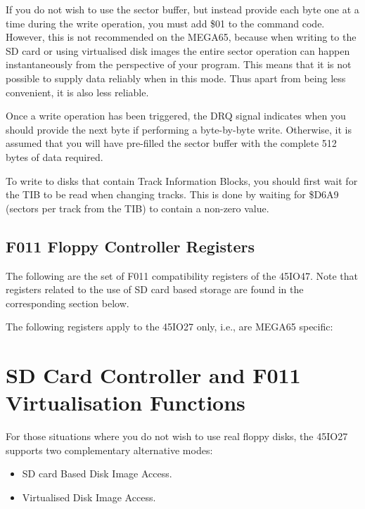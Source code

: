 If you do not wish
to use the sector buffer, but instead provide each byte one at a time
during the write operation, you must add \$01 to the command code.
However, this is not recommended on the MEGA65, because when writing
to the SD card or using virtualised disk images the entire sector
operation can happen instantaneously from the perspective of your
program.  This means that it is not possible to supply data reliably
when in this mode.  Thus apart from being less convenient, it is also
less reliable. 

Once a write operation has been triggered, the DRQ signal indicates
when you should provide the next byte if performing a byte-by-byte
write. Otherwise, it is assumed that you will have pre-filled the
sector buffer with the complete 512 bytes of data required.

To write to disks that contain Track Information Blocks,
you should first wait for the TIB to be read when changing tracks. This is done by waiting
for \$D6A9 (sectors per track from the TIB) to contain a non-zero value.

\subsection{F011 Floppy Controller Registers}

The following are the set of F011 compatibility registers of the 45IO47.
Note that registers related to the use of SD card based storage are found in the corresponding section below.



The following registers apply to the 45IO27 only, i.e., are MEGA65 specific:



\section{SD Card Controller and F011 Virtualisation Functions}

For those situations where you do not wish to use real floppy disks,
the 45IO27 supports two complementary alternative modes:

\begin{itemize}
\item SD card Based Disk Image Access.
\item Virtualised Disk Image Access.
\end{itemize}

